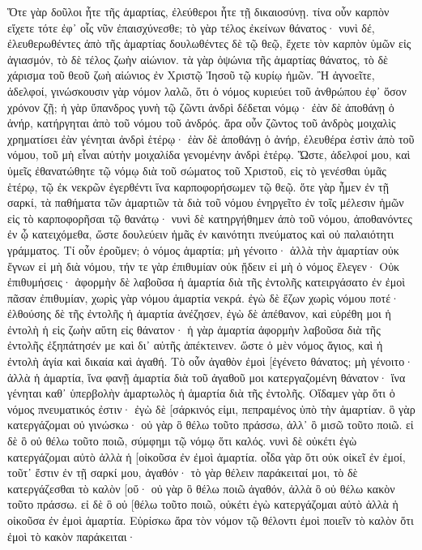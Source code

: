 Ὅτε γὰρ δοῦλοι ἦτε τῆς ἁμαρτίας, ἐλεύθεροι ἦτε τῇ δικαιοσύνῃ. 
τίνα οὖν καρπὸν εἴχετε τότε ἐφ᾽ οἷς νῦν ἐπαισχύνεσθε; τὸ γὰρ τέλος ἐκείνων θάνατος· 
νυνὶ δέ, ἐλευθερωθέντες ἀπὸ τῆς ἁμαρτίας δουλωθέντες δὲ τῷ θεῷ, ἔχετε τὸν καρπὸν ὑμῶν εἰς ἁγιασμόν, τὸ δὲ τέλος ζωὴν αἰώνιον. 
τὰ γὰρ ὀψώνια τῆς ἁμαρτίας θάνατος, τὸ δὲ χάρισμα τοῦ θεοῦ ζωὴ αἰώνιος ἐν Χριστῷ Ἰησοῦ τῷ κυρίῳ ἡμῶν. 
Ἢ ἀγνοεῖτε, ἀδελφοί, γινώσκουσιν γὰρ νόμον λαλῶ, ὅτι ὁ νόμος κυριεύει τοῦ ἀνθρώπου ἐφ᾽ ὅσον χρόνον ζῇ; 
ἡ γὰρ ὕπανδρος γυνὴ τῷ ζῶντι ἀνδρὶ δέδεται νόμῳ· ἐὰν δὲ ἀποθάνῃ ὁ ἀνήρ, κατήργηται ἀπὸ τοῦ νόμου τοῦ ἀνδρός. 
ἄρα οὖν ζῶντος τοῦ ἀνδρὸς μοιχαλὶς χρηματίσει ἐὰν γένηται ἀνδρὶ ἑτέρῳ· ἐὰν δὲ ἀποθάνῃ ὁ ἀνήρ, ἐλευθέρα ἐστὶν ἀπὸ τοῦ νόμου, τοῦ μὴ εἶναι αὐτὴν μοιχαλίδα γενομένην ἀνδρὶ ἑτέρῳ. 
Ὥστε, ἀδελφοί μου, καὶ ὑμεῖς ἐθανατώθητε τῷ νόμῳ διὰ τοῦ σώματος τοῦ Χριστοῦ, εἰς τὸ γενέσθαι ὑμᾶς ἑτέρῳ, τῷ ἐκ νεκρῶν ἐγερθέντι ἵνα καρποφορήσωμεν τῷ θεῷ. 
ὅτε γὰρ ἦμεν ἐν τῇ σαρκί, τὰ παθήματα τῶν ἁμαρτιῶν τὰ διὰ τοῦ νόμου ἐνηργεῖτο ἐν τοῖς μέλεσιν ἡμῶν εἰς τὸ καρποφορῆσαι τῷ θανάτῳ· 
νυνὶ δὲ κατηργήθημεν ἀπὸ τοῦ νόμου, ἀποθανόντες ἐν ᾧ κατειχόμεθα, ὥστε δουλεύειν ἡμᾶς ἐν καινότητι πνεύματος καὶ οὐ παλαιότητι γράμματος. 
Τί οὖν ἐροῦμεν; ὁ νόμος ἁμαρτία; μὴ γένοιτο· ἀλλὰ τὴν ἁμαρτίαν οὐκ ἔγνων εἰ μὴ διὰ νόμου, τήν τε γὰρ ἐπιθυμίαν οὐκ ᾔδειν εἰ μὴ ὁ νόμος ἔλεγεν· Οὐκ ἐπιθυμήσεις· 
ἀφορμὴν δὲ λαβοῦσα ἡ ἁμαρτία διὰ τῆς ἐντολῆς κατειργάσατο ἐν ἐμοὶ πᾶσαν ἐπιθυμίαν, χωρὶς γὰρ νόμου ἁμαρτία νεκρά. 
ἐγὼ δὲ ἔζων χωρὶς νόμου ποτέ· ἐλθούσης δὲ τῆς ἐντολῆς ἡ ἁμαρτία ἀνέζησεν, 
ἐγὼ δὲ ἀπέθανον, καὶ εὑρέθη μοι ἡ ἐντολὴ ἡ εἰς ζωὴν αὕτη εἰς θάνατον· 
ἡ γὰρ ἁμαρτία ἀφορμὴν λαβοῦσα διὰ τῆς ἐντολῆς ἐξηπάτησέν με καὶ δι᾽ αὐτῆς ἀπέκτεινεν. 
ὥστε ὁ μὲν νόμος ἅγιος, καὶ ἡ ἐντολὴ ἁγία καὶ δικαία καὶ ἀγαθή. 
Τὸ οὖν ἀγαθὸν ἐμοὶ [ἐγένετο θάνατος; μὴ γένοιτο· ἀλλὰ ἡ ἁμαρτία, ἵνα φανῇ ἁμαρτία διὰ τοῦ ἀγαθοῦ μοι κατεργαζομένη θάνατον· ἵνα γένηται καθ᾽ ὑπερβολὴν ἁμαρτωλὸς ἡ ἁμαρτία διὰ τῆς ἐντολῆς. 
Οἴδαμεν γὰρ ὅτι ὁ νόμος πνευματικός ἐστιν· ἐγὼ δὲ [σάρκινός εἰμι, πεπραμένος ὑπὸ τὴν ἁμαρτίαν. 
ὃ γὰρ κατεργάζομαι οὐ γινώσκω· οὐ γὰρ ὃ θέλω τοῦτο πράσσω, ἀλλ᾽ ὃ μισῶ τοῦτο ποιῶ. 
εἰ δὲ ὃ οὐ θέλω τοῦτο ποιῶ, σύμφημι τῷ νόμῳ ὅτι καλός. 
νυνὶ δὲ οὐκέτι ἐγὼ κατεργάζομαι αὐτὸ ἀλλὰ ἡ [οἰκοῦσα ἐν ἐμοὶ ἁμαρτία. 
οἶδα γὰρ ὅτι οὐκ οἰκεῖ ἐν ἐμοί, τοῦτ᾽ ἔστιν ἐν τῇ σαρκί μου, ἀγαθόν· τὸ γὰρ θέλειν παράκειταί μοι, τὸ δὲ κατεργάζεσθαι τὸ καλὸν [οὔ· 
οὐ γὰρ ὃ θέλω ποιῶ ἀγαθόν, ἀλλὰ ὃ οὐ θέλω κακὸν τοῦτο πράσσω. 
εἰ δὲ ὃ οὐ [θέλω τοῦτο ποιῶ, οὐκέτι ἐγὼ κατεργάζομαι αὐτὸ ἀλλὰ ἡ οἰκοῦσα ἐν ἐμοὶ ἁμαρτία. 
Εὑρίσκω ἄρα τὸν νόμον τῷ θέλοντι ἐμοὶ ποιεῖν τὸ καλὸν ὅτι ἐμοὶ τὸ κακὸν παράκειται· 
